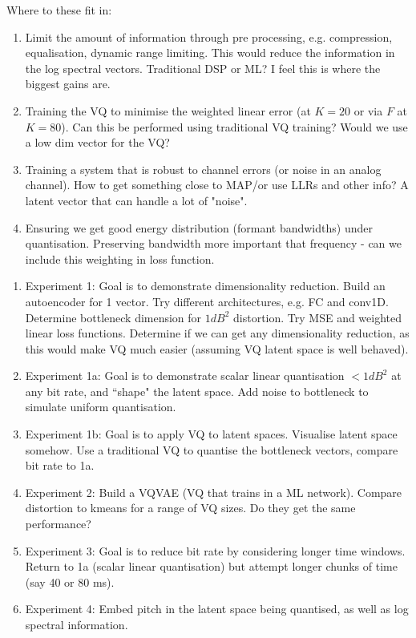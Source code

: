 \documentclass{article}
\begin{document}
Where to these fit in:
\begin{enumerate}
\item Limit the amount of information through pre processing, e.g. compression, equalisation, dynamic range limiting.  This would reduce the information in the log spectral vectors.  Traditional DSP or ML? I feel this is where the biggest gains are.
\item Training the VQ to minimise the weighted linear error (at $K=20$ or via $F$ at $K=80$).  Can this be performed using traditional VQ training?  Would we use a low dim vector for the VQ?
\item Training a system that is robust to channel errors (or noise in an analog channel). How to get something close to MAP/or use LLRs and other info?  A latent vector that can handle a lot of "noise".
\item Ensuring we get good energy distribution (formant bandwidths) under quantisation.  Preserving bandwidth more important that frequency - can we include this weighting in loss function.
\end{enumerate}

\begin{enumerate}
\item Experiment 1: Goal is to demonstrate dimensionality reduction.  Build an autoencoder for 1 vector.  Try different architectures, e.g. FC and conv1D.  Determine bottleneck dimension for $1dB^2$ distortion.  Try MSE and weighted linear loss functions. Determine if we can get any dimensionality reduction, as this would make VQ much easier (assuming VQ latent space is well behaved).
\item Experiment 1a: Goal is to demonstrate scalar linear quantisation $< 1dB^2$ at any bit rate, and ``shape" the latent space. Add noise to bottleneck to simulate uniform quantisation.
\item Experiment 1b: Goal is to apply VQ to latent spaces. Visualise latent space somehow. Use a traditional VQ to quantise the bottleneck vectors, compare bit rate to 1a.
\item Experiment 2: Build a VQVAE (VQ that trains in a ML network).  Compare distortion to kmeans for a range of VQ sizes.  Do they get the same performance?
\item Experiment 3: Goal is to reduce bit rate by considering longer time windows.  Return to 1a (scalar linear quantisation) but attempt longer chunks of time (say 40 or 80 ms).
\item Experiment 4: Embed pitch in the latent space being quantised, as well as log spectral information.
\end{enumerate}
\end{document}

